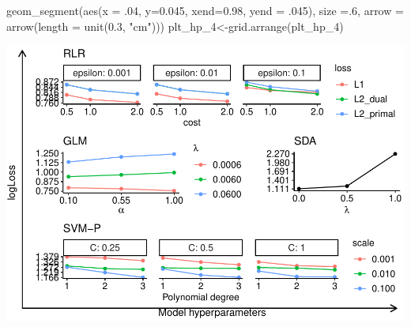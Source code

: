 \documentclass[
]{article}
\newenvironment{Shaded}{\begin{snugshade}}{\end{snugshade}}
\newcommand{\AttributeTok}[1]{\textcolor[rgb]{0.77,0.63,0.00}{#1}}
\newcommand{\DecValTok}[1]{\textcolor[rgb]{0.00,0.00,0.81}{#1}}
\newcommand{\FloatTok}[1]{\textcolor[rgb]{0.00,0.00,0.81}{#1}}
\newcommand{\FunctionTok}[1]{\textcolor[rgb]{0.00,0.00,0.00}{#1}}
\newcommand{\NormalTok}[1]{#1}
\newcommand{\OtherTok}[1]{\textcolor[rgb]{0.56,0.35,0.01}{#1}}
\newcommand{\StringTok}[1]{\textcolor[rgb]{0.31,0.60,0.02}{#1}}
\begin{document}
\begin{Shaded}
\begin{Highlighting}[]
  \FunctionTok{geom\_segment}\NormalTok{(}\FunctionTok{aes}\NormalTok{(}\AttributeTok{x =}\NormalTok{ .}\DecValTok{04}\NormalTok{, }\AttributeTok{y=}\FloatTok{0.045}\NormalTok{, }\AttributeTok{xend=}\FloatTok{0.98}\NormalTok{, }\AttributeTok{yend =}\NormalTok{ .}\DecValTok{045}\NormalTok{), }\AttributeTok{size =}\NormalTok{.}\DecValTok{6}\NormalTok{,}
               \AttributeTok{arrow =} \FunctionTok{arrow}\NormalTok{(}\AttributeTok{length =} \FunctionTok{unit}\NormalTok{(}\FloatTok{0.3}\NormalTok{, }\StringTok{"cm"}\NormalTok{)))}
\NormalTok{plt\_hp\_4}\OtherTok{\textless{}{-}}\FunctionTok{grid.arrange}\NormalTok{(plt\_hp\_4)}
\end{Highlighting}
\end{Shaded}

\includegraphics{sl-inf-cairs-2301_files/figure-latex/optResults2-1.pdf}
\end{document}
